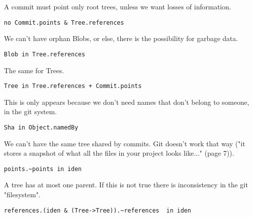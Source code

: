 A commit must point only root trees, unless we want
losses of information.
\begin{lstlisting}
no Commit.points & Tree.references    
\end{lstlisting}

We can't have orphan Blobs, or else, 
there is the possibility for garbage data.
\begin{lstlisting}
Blob in Tree.references
\end{lstlisting}

The same for Trees.
\begin{lstlisting}
Tree in Tree.references + Commit.points
\end{lstlisting}

This is only appears because we don't need
names that don't belong to someone, in the git
system.
\begin{lstlisting}
Sha in Object.namedBy
\end{lstlisting}

We can't have the same tree shared by commits. Git
doesn't work that way ("it stores a snapshot of what all 
the files in your project looks like..." \cite{gitComm} (page 7)).
\begin{lstlisting}
points.~points in iden 
\end{lstlisting}

A tree has at most one parent. If this is not true there 
is inconsistency in the git "filesystem".
\begin{lstlisting}
references.(iden & (Tree->Tree)).~references  in iden
\end{lstlisting}

